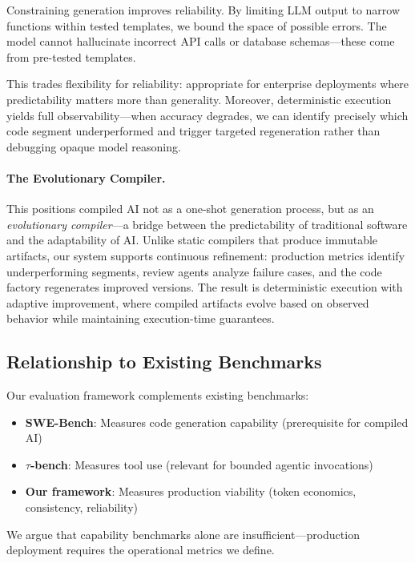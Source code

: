 \documentclass[11pt]{article}
\begin{document}
Constraining generation improves reliability. By limiting LLM output to narrow functions within tested templates, we bound the space of possible errors. The model cannot hallucinate incorrect API calls or database schemas---these come from pre-tested templates.

This trades flexibility for reliability: appropriate for enterprise deployments where predictability matters more than generality. Moreover, deterministic execution yields full observability---when accuracy degrades, we can identify precisely which code segment underperformed and trigger targeted regeneration rather than debugging opaque model reasoning.

\paragraph{The Evolutionary Compiler.} This positions compiled AI not as a one-shot generation process, but as an \emph{evolutionary compiler}---a bridge between the predictability of traditional software and the adaptability of AI. Unlike static compilers that produce immutable artifacts, our system supports continuous refinement: production metrics identify underperforming segments, review agents analyze failure cases, and the code factory regenerates improved versions. The result is deterministic execution with adaptive improvement, where compiled artifacts evolve based on observed behavior while maintaining execution-time guarantees.

\subsection{Relationship to Existing Benchmarks}

Our evaluation framework complements existing benchmarks:
\begin{itemize}
    \item \textbf{SWE-Bench}: Measures code generation capability (prerequisite for compiled AI)
    \item \textbf{$\tau$-bench}: Measures tool use (relevant for bounded agentic invocations)
    \item \textbf{Our framework}: Measures production viability (token economics, consistency, reliability)
\end{itemize}

We argue that capability benchmarks alone are insufficient---production deployment requires the operational metrics we define.

\end{document}
